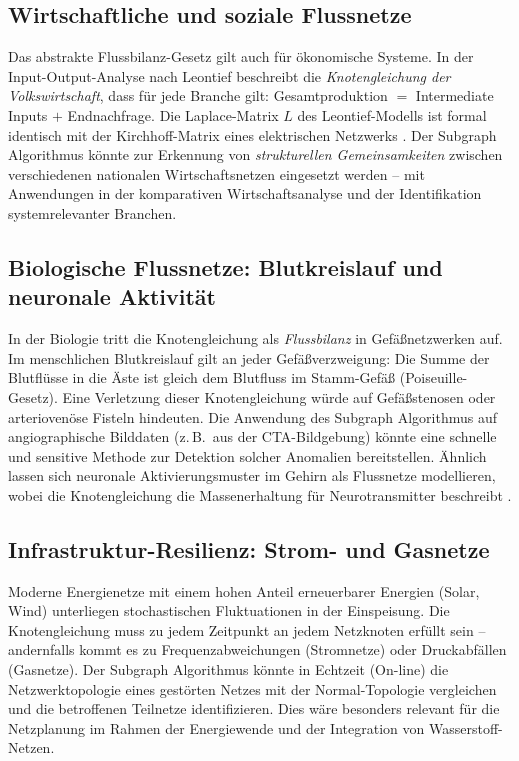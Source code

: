 ﻿\documentclass[a4paper,12pt]{article}
\theoremstyle{definition}
\begin{document}
\subsection{Wirtschaftliche und soziale Flussnetze}

Das abstrakte Flussbilanz-Gesetz gilt auch für ökonomische Systeme.
In der Input-Output-Analyse nach Leontief beschreibt die
\emph{Knotengleichung der Volkswirtschaft}, dass für jede Branche gilt:
Gesamtproduktion $=$ Intermediate Inputs $+$ Endnachfrage. Die Laplace-Matrix
$L$ des Leontief-Modells ist formal identisch mit der Kirchhoff-Matrix eines
elektrischen Netzwerks \cite{leontief1986}. Der Subgraph Algorithmus könnte
zur Erkennung von \emph{strukturellen Gemeinsamkeiten} zwischen verschiedenen
nationalen Wirtschaftsnetzen eingesetzt werden -- mit Anwendungen in der
komparativen Wirtschaftsanalyse und der Identifikation systemrelevanter
Branchen.

\subsection{Biologische Flussnetze: Blutkreislauf und neuronale Aktivität}

In der Biologie tritt die Knotengleichung als \emph{Flussbilanz} in
Gefäß\-netzwerken auf. Im menschlichen Blutkreislauf gilt an jeder
Gefäß\-verzweigung: Die Summe der Blutflüsse in die Äste ist gleich dem
Blutfluss im Stamm-Gefäß (Poiseuille-Gesetz). Eine Verletzung dieser
Knotengleichung würde auf Gefäßstenosen oder arteriovenöse Fisteln
hindeuten. Die Anwendung des Subgraph Algorithmus auf angiographische
Bilddaten (z.\,B.\ aus der CTA-Bildgebung) könnte eine schnelle und
sensitive Methode zur Detektion solcher Anomalien bereitstellen.
Ähnlich lassen sich neuronale Aktivierungsmuster im Gehirn als Flussnetze
modellieren, wobei die Knotengleichung die Massenerhaltung für
Neurotransmitter beschreibt \cite{sporns2005}.

\subsection{Infrastruktur-Resilienz: Strom- und Gasnetze}

Moderne Energienetze mit einem hohen Anteil erneuerbarer Energien
(Solar, Wind) unterliegen stochastischen Fluktuationen in der Einspeisung.
Die Knotengleichung muss zu jedem Zeitpunkt an jedem Netzknoten erfüllt
sein -- andernfalls kommt es zu Frequenzabweichungen (Stromnetze) oder
Druckabfällen (Gasnetze). Der Subgraph Algorithmus könnte in Echtzeit
(On-line) die Netzwerktopologie eines gestörten Netzes mit der
Normal-Topologie vergleichen und die betroffenen Teilnetze identifizieren.
Dies wäre besonders relevant für die Netzplanung im Rahmen der
Energiewende und der Integration von Wasserstoff-Netzen.
\end{document}

